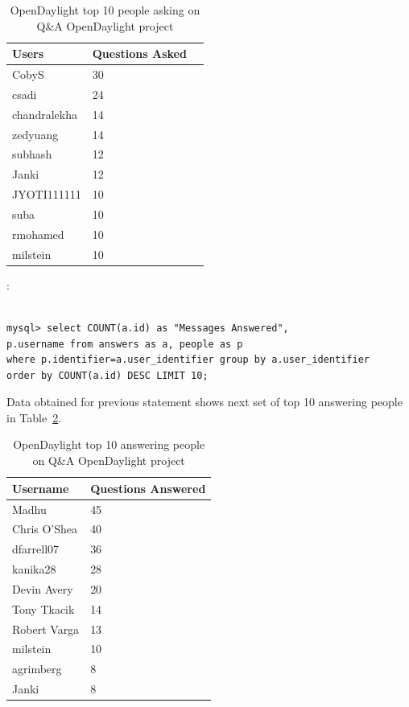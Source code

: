 \documentclass[a4paper, 12pt]{book}
\begin{document}
{\begin{table}
\footnotesize
\begin{center}
\begin{tabular}{|l|l|p{3cm}|}
\hline
\textbf{Users}  & \textbf{Questions Asked} \\ \hline
CobyS         & 30 \\ \hline
csadi         & 24 \\ \hline
chandralekha  & 14 \\ \hline
zedyuang      & 14 \\ \hline
subhash       & 12 \\ \hline
Janki         & 12 \\ \hline
JYOTI111111   & 10 \\ \hline
suba          & 10 \\ \hline
rmohamed      & 10 \\ \hline
milstein      & 10 \\ \hline
\end{tabular}
\end{center}
\caption{OpenDaylight top 10 people asking on Q\&A OpenDaylight project}
\label{tab:odl_top_people_asking}
\end{table}
:

\begin{verbatim}

mysql> select COUNT(a.id) as "Messages Answered",
p.username from answers as a, people as p
where p.identifier=a.user_identifier group by a.user_identifier
order by COUNT(a.id) DESC LIMIT 10;

\end{verbatim}
Data obtained for previous statement shows next set of top 10 answering people in Table~\ref{tab:odl_top_people_answering}.

\begin{table}
\footnotesize
\begin{center}
\begin{tabular}{|p{3cm}|l|}
\hline
\textbf{Username} & \textbf{Questions Answered} \\ \hline
Madhu        & 45\\ \hline
Chris O'Shea & 40\\ \hline
dfarrell07   & 36\\ \hline
kanika28     & 28\\ \hline
Devin Avery  & 20\\ \hline
Tony Tkacik  & 14\\ \hline
Robert Varga & 13\\ \hline
milstein     & 10\\ \hline
agrimberg    & 8 \\ \hline
Janki        & 8 \\ \hline
\end{tabular}
\end{center}
\caption{OpenDaylight top 10 answering people on Q\&A OpenDaylight project}
\label{tab:odl_top_people_answering}
\end{table}

}
\end{document}
